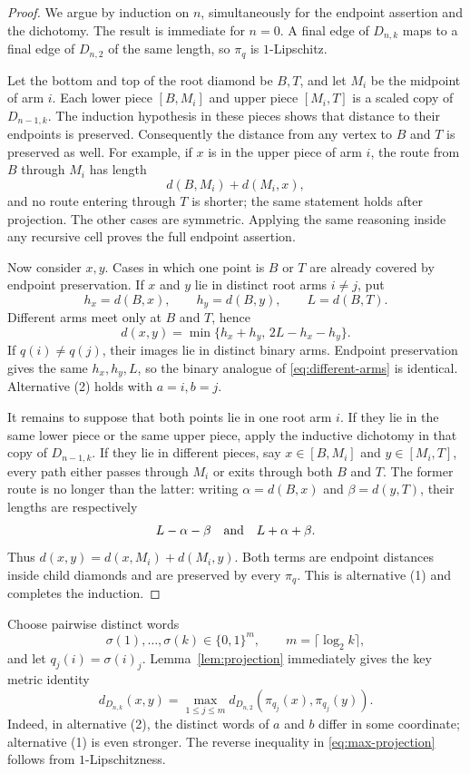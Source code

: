 \documentclass[11pt]{article}
\begin{document}
\begin{proof}
We argue by induction on $n$, simultaneously for the endpoint assertion and
the dichotomy.  The result is immediate for $n=0$.  A final edge of
$D_{n,k}$ maps to a final edge of $D_{n,2}$ of the same length, so $\pi_q$ is
$1$-Lipschitz.

Let the bottom and top of the root diamond be $B,T$, and let $M_i$ be the
midpoint of arm $i$.  Each lower piece $[B,M_i]$ and upper piece $[M_i,T]$
is a scaled copy of $D_{n-1,k}$.  The induction hypothesis in these pieces
shows that distance to their endpoints is preserved.  Consequently the
distance from any vertex to $B$ and $T$ is preserved as well.  For example,
if $x$ is in the upper piece of arm $i$, the route from $B$ through $M_i$ has
length
\[
             d(B,M_i)+d(M_i,x),
\]
and no route entering through $T$ is shorter; the same statement holds after
projection.  The other cases are symmetric.  Applying the same reasoning
inside any recursive cell proves the full endpoint assertion.

Now consider $x,y$.  Cases in which one point is $B$ or $T$ are already
covered by endpoint preservation.  If $x$ and $y$ lie in distinct root arms
$i\ne j$, put
\[
 h_x=d(B,x),\qquad h_y=d(B,y),\qquad L=d(B,T).
\]
Different arms meet only at $B$ and $T$, hence
\begin{equation}\label{eq:different-arms}
 d(x,y)=\min\{h_x+h_y,\,2L-h_x-h_y\}.
\end{equation}
If $q(i)\ne q(j)$, their images lie in distinct binary arms.  Endpoint
preservation gives the same $h_x,h_y,L$, so the binary analogue of
\eqref{eq:different-arms} is identical.  Alternative (2) holds with
$a=i,b=j$.

It remains to suppose that both points lie in one root arm $i$.  If they lie
in the same lower piece or the same upper piece, apply the inductive
dichotomy in that copy of $D_{n-1,k}$.  If they lie in different pieces, say
$x\in[B,M_i]$ and $y\in[M_i,T]$, every path either passes through $M_i$ or
exits through both $B$ and $T$.  The former route is no longer than the latter:
writing $\alpha=d(B,x)$ and $\beta=d(y,T)$, their lengths are respectively
\[
             L-\alpha-\beta
       \quad\hbox{and}\quad
             L+\alpha+\beta.
\]
Thus
$d(x,y)=d(x,M_i)+d(M_i,y)$.  Both terms are endpoint distances inside child
diamonds and are preserved by every $\pi_q$.  This is alternative (1) and
completes the induction.
\end{proof}

Choose pairwise distinct words
\[
       \sigma(1),\ldots,\sigma(k)\in\{0,1\}^m,
       \qquad m=\lceil\log_2 k\rceil,
\]
and let $q_j(i)=\sigma(i)_j$.  Lemma~\ref{lem:projection} immediately gives
the key metric identity
\begin{equation}\label{eq:max-projection}
 d_{D_{n,k}}(x,y)
 =\max_{1\le j\le m}
   d_{D_{n,2}}(\pi_{q_j}(x),\pi_{q_j}(y)).
\end{equation}
Indeed, in alternative (2), the distinct words of $a$ and $b$ differ in some
coordinate; alternative (1) is even stronger.  The reverse inequality in
\eqref{eq:max-projection} follows from $1$-Lipschitzness.
\end{document}
